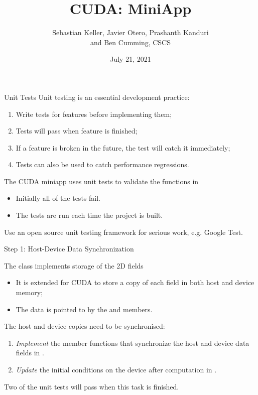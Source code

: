 \documentclass[aspectratio=43]{beamer}
\author{Sebastian Keller, Javier Otero, Prashanth Kanduri\\ and Ben Cumming, CSCS}
\title{CUDA: MiniApp}
\subtitle{}
\date{July 21, 2021}
\begin{document}
\cscstitle

\begin{frame}[fragile]{Unit Tests}
    Unit testing is an essential development practice:
    \begin{enumerate}
        \item Write tests for features before implementing them;
        \item Tests will pass when feature is finished;
        \item If a feature is broken in the future, the test will catch it immediately;
        \item Tests can also be used to catch performance regressions.
    \end{enumerate}
    The CUDA miniapp uses unit tests to validate the functions in 
    \begin{itemize}
        \item Initially all of the tests fail.
        \item The tests are run each time the project is built.
    \end{itemize}
    Use an open source unit testing framework for serious work, e.g. Google Test.
\end{frame}

\begin{frame}[fragile]{Step 1: Host-Device Data Synchronization}
    \begin{info}{The  class implements storage of the 2D fields}
        \begin{itemize}
            \item It is extended for CUDA to store a copy of each field in both host and device memory;
            \item The data is pointed to by the  and  members.
        \end{itemize}
    \end{info}
    The host and device copies need to be synchronised:
    \begin{enumerate}
        \item \emph{Implement} the member functions that synchronize the host and device data fields in .
        \item \emph{Update} the initial conditions on the device after computation in .
    \end{enumerate}
    \begin{info}{}
        Two of the unit tests will pass when this task is finished.
    \end{info}
\end{frame}
\end{document}
